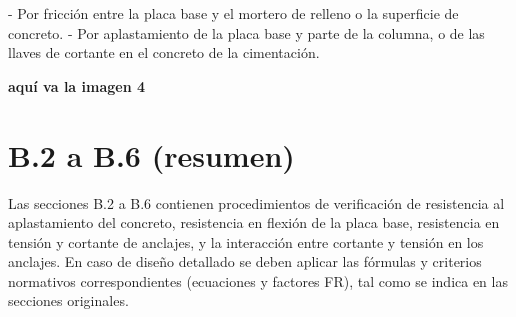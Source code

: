 - Por fricción entre la placa base y el mortero de relleno o la superficie de concreto.
- Por aplastamiento de la placa base y parte de la columna, o de las llaves de cortante en el concreto de la cimentación.

\begin{center}
\textbf{aquí va la imagen 4}
\end{center}

\section*{B.2 a B.6 (resumen)}

Las secciones B.2 a B.6 contienen procedimientos de verificación de resistencia al aplastamiento del concreto, resistencia en flexión de la placa base, resistencia en tensión y cortante de anclajes, y la interacción entre cortante y tensión en los anclajes. En caso de diseño detallado se deben aplicar las fórmulas y criterios normativos correspondientes (ecuaciones y factores FR), tal como se indica en las secciones originales.

